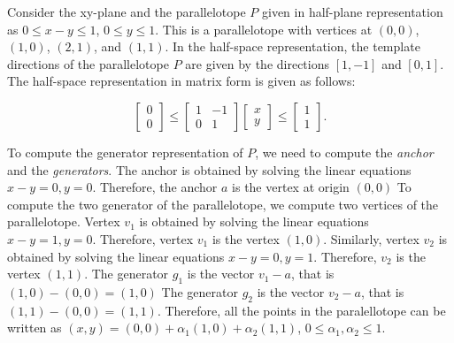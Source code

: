 \begin{example}
  \label{ex:ptope}
  Consider the xy-plane and the parallelotope $P$ given in half-plane representation as $0 \leq x-y \leq 1$, $0 \leq y \leq 1$.
  This is a parallelotope with vertices at $(0,0)$, $(1,0)$, $(2,1)$, and $(1,1)$.
  In the half-space representation, the template directions of the parallelotope $P$ are given by the directions $[1, -1]$ and $[0, 1]$.
  The half-space representation in matrix form is given as follows:

  \begin{equation}
    \begin{bmatrix} 0 \\ 0 \end{bmatrix} \leq \begin{bmatrix}  1 & -1 \\ 0 &  1 \end{bmatrix}  \begin{bmatrix} x \\ y \end{bmatrix} \leq \begin{bmatrix} 1 \\ 1 \end{bmatrix}. \label{eq:ptopeexample}
\end{equation}

  To compute the generator representation of $P$, we need to compute the \emph{anchor} and the \emph{generators}.
  The anchor is obtained by solving the linear equations $x-y = 0, y = 0$.
  Therefore, the anchor $a$ is the vertex at origin $(0,0)$
  To compute the two generator of the parallelotope, we compute two vertices of the parallelotope.
  Vertex $v_1$ is obtained by solving the linear equations $x - y = 1, y = 0$.
  Therefore, vertex $v_1$ is the vertex $(1,0)$.
  Similarly, vertex $v_2$ is obtained by solving the linear equations $x-y = 0, y = 1$.
  Therefore, $v_2$ is the vertex $(1,1)$.
  The generator $g_1$ is the vector $v_1 - a$, that is $(1,0)- (0,0) = (1,0)$
  The generator $g_2$ is the vector $v_2 - a$, that is $(1,1) - (0,0) = (1,1)$.
  Therefore, all the points in the paralellotope can be written as $(x,y) = (0,0) + \alpha_1 (1,0) + \alpha_2(1,1)$, $0 \leq \alpha_1, \alpha_2 \leq 1$.
\end{example}



